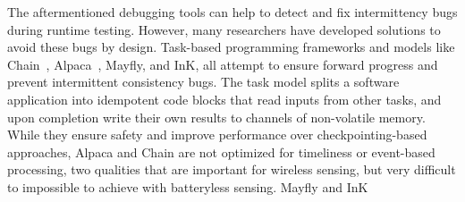 The aftermentioned debugging tools can help to detect and fix intermittency bugs during runtime testing. However, many researchers have developed solutions to avoid these bugs by design.
Task-based programming frameworks and models like 
Chain~\cite{colin2016chain}, Alpaca~\cite{maeng2017alpaca}, Mayfly, and InK, all attempt to ensure forward progress and prevent intermittent consistency bugs. 
The task model splits a software application into idempotent code blocks that read inputs from other tasks, and upon completion write their own results to channels of non-volatile memory. 
While they ensure safety and improve performance over checkpointing-based approaches, Alpaca and Chain are not optimized for timeliness or event-based processing, two qualities that are important for wireless sensing, but very difficult to impossible to achieve with batteryless sensing.
Mayfly and InK

